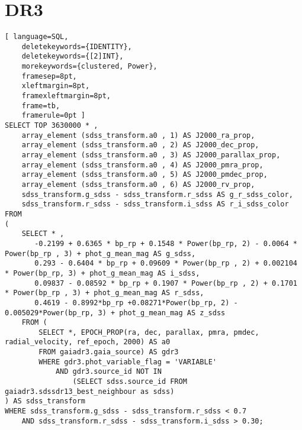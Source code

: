\section{DR3} \label{apendice:gaiaAdql:dr3}
\begin{lstlisting}[ language=SQL,
	deletekeywords={IDENTITY},
	deletekeywords={[2]INT},
	morekeywords={clustered, Power},
	framesep=8pt,
	xleftmargin=8pt,
	framexleftmargin=8pt,
	frame=tb,
	framerule=0pt ]
SELECT TOP 3630000 * ,
	array_element (sdss_transform.a0 , 1) AS J2000_ra_prop,
	array_element (sdss_transform.a0 , 2) AS J2000_dec_prop,
	array_element (sdss_transform.a0 , 3) AS J2000_parallax_prop,
	array_element (sdss_transform.a0 , 4) AS J2000_pmra_prop,
	array_element (sdss_transform.a0 , 5) AS J2000_pmdec_prop,
	array_element (sdss_transform.a0 , 6) AS J2000_rv_prop,
	sdss_transform.g_sdss - sdss_transform.r_sdss AS g_r_sdss_color,
	sdss_transform.r_sdss - sdss_transform.i_sdss AS r_i_sdss_color
FROM
(
	SELECT * ,
	   -0.2199 + 0.6365 * bp_rp + 0.1548 * Power(bp_rp, 2) - 0.0064 * Power(bp_rp , 3) + phot_g_mean_mag AS g_sdss,
	   0.293 - 0.6404 * bp_rp + 0.09609 * Power(bp_rp , 2) + 0.002104 * Power(bp_rp, 3) + phot_g_mean_mag AS i_sdss,
	   0.09837 - 0.08592 * bp_rp + 0.1907 * Power(bp_rp , 2) + 0.1701 * Power(bp_rp , 3) + phot_g_mean_mag AS r_sdss,
	   0.4619 - 0.8992*bp_rp +0.08271*Power(bp_rp, 2) - 0.005029*Power(bp_rp, 3) + phot_g_mean_mag AS z_sdss
	FROM (
		SELECT *, EPOCH_PROP(ra, dec, parallax, pmra, pmdec, radial_velocity, ref_epoch, 2000) AS a0
		FROM gaiadr3.gaia_source) AS gdr3
		WHERE gdr3.phot_variable_flag = 'VARIABLE'
			AND gdr3.source_id NOT IN
				(SELECT sdss.source_id FROM gaiadr3.sdssdr13_best_neighbour as sdss)
) AS sdss_transform
WHERE sdss_transform.g_sdss - sdss_transform.r_sdss < 0.7
	AND sdss_transform.r_sdss - sdss_transform.i_sdss > 0.30;

\end{lstlisting}